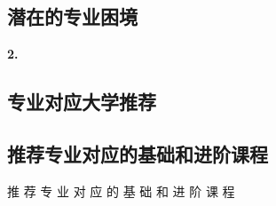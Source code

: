 \documentclass[12pt]{article}
\begin{document}
\begin{CJK*}{UTF8}{gbsn}
\newpage
\subsection*{潜在的专业困境}\textbf{2.} %


\newpage
\subsection*{专业对应大学推荐}


\newpage
\subsection*{推荐专业对应的基础和进阶课程}
推 荐 专 业 对 应 的 基 础 和 进 阶 课 程


   

\end{CJK*}
\end{document}
